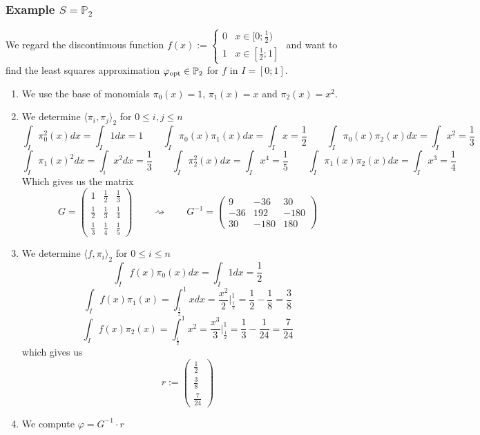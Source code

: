 \subsubsection{Example \(S = \mathbb{P}_2\)}
We regard the discontinuous function \(f(x) := \begin{cases} 0 & x \in [0; \frac{1}{2})\\ 1 & x \in [\frac{1}{2}; 1]\end{cases}\)
and want to find the least squares approximation \(\varphi_{\operatorname{opt}} \in \mathbb{P}_2\) for \(f\) in \(I = [0; 1]\).

\begin{enumerate}
   \item We use the base of monomials \(\pi_0(x) = 1\), \(\pi_1(x) = x\) and \(\pi_2(x) = x^2\).
   \item We determine \(\langle \pi_i, \pi_j \rangle_2\) for \(0 \leq i, j \leq n\)
      \[\int_I \pi_0^2(x) dx = \int_I 1 dx = 1 \qquad \int_I \pi_0(x) \pi_1(x) dx = \int_I x = \frac{1}{2} \qquad \int_I \pi_0(x) \pi_2(x) dx = \int_I x^2 = \frac{1}{3}\]
      \[\int_I \pi_1(x)^2dx = \int_i x^2dx = \frac{1}{3} \qquad \int_I \pi_2^2(x) dx = \int_I x^4 = \frac{1}{5} \qquad \int_I \pi_1(x) \pi_2(x) dx = \int_I x^3 = \frac{1}{4}\]
      Which gives us the matrix
      \[G = \begin{pmatrix}1 & \frac{1}{2} & \frac{1}{3}\\ \frac{1}{2} & \frac{1}{3} & \frac{1}{4}\\ \frac{1}{3} & \frac{1}{4} & \frac{1}{5}\end{pmatrix} \qquad\rightsquigarrow\qquad G^{-1} = \begin{pmatrix}9&-36&30\\-36&192&-180\\30&-180&180\end{pmatrix}\]
   \item We determine \(\langle f, \pi_i \rangle_2\) for \(0 \leq i \leq n\)
   \[\int_I f(x) \pi_0(x) dx = \int_I 1 dx = \frac{1}{2}\]
   \[\int_I f(x) \pi_1(x) = \int_\frac{1}{2}^1 x dx = \frac{x^2}{2}\rvert_\frac{1}{2}^1 = \frac{1}{2} - \frac{1}{8} = \frac{3}{8}\]
   \[\int_I f(x) \pi_2(x) = \int_\frac{1}{2}^1 x^2 = \frac{x^3}{3}\rvert_\frac{1}{2}^1 = \frac{1}{3} - \frac{1}{24} = \frac{7}{24}\]
   which gives us 
   \[r := \begin{pmatrix}\frac{1}{2}\\\frac{3}{8}\\\frac{7}{24}\end{pmatrix}\]
   \item We compute \(\varphi = G^{-1} \cdot r\)

\end{enumerate}

